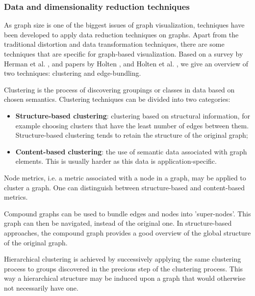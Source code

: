 \subsubsection{Data and dimensionality reduction techniques}\label{chapter:literature_study:section:interaction:subsection:graphs:subsubsection:reduction}

As graph size is one of the biggest issues of graph visualization, techniques have been developed to apply data reduction techniques on graphs\cite{herman:2000, shirley:2009}. Apart from the traditional distortion and data transformation techniques, there are some techniques that are specific for graph-based visualization. Based on a survey by Herman et al. \cite{herman:2000}, and papers by Holten \cite{Holten:2006:HEB:1187627.1187772}, and Holten et al. \cite{holten:2009}, we give an overview of two techniques: clustering and edge-bundling.

Clustering is the process of discovering groupings or classes in data based on chosen semantics. Clustering techniques can be divided into two categories:

\begin{itemize}
	\item \textbf{Structure-based clustering}: clustering based on structural information, for example choosing clusters that have the least number of edges between them. Structure-based clustering tends to retain the structure of the original graph;
	\item \textbf{Content-based clustering}: the use of semantic data associated with graph elements. This is usually harder as this data is application-specific.
\end{itemize}

Node metrics, i.e. a metric associated with a node in a graph, may be applied to cluster a graph. One can distinguish between structure-based and content-based metrics\cite{herman:2000}.

Compound graphs can be used to bundle edges and nodes into 'super-nodes'. This graph can then be navigated, instead of the original one. In structure-based approaches, the compound graph provides a good overview of the global structure of the original graph\cite{herman:2000}.

Hierarchical clustering is achieved by successively applying the same clustering process to groups discovered in the precious step of the clustering process. This way a hierarchical structure may be induced upon a graph that would otherwise not necessarily have one\cite{herman:2000}.

